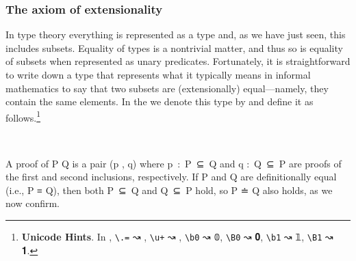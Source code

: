\subsubsection{The axiom of extensionality}\label{sec:axiom-ext}
In type theory everything is represented as a type and, as we have just seen, this includes subsets.  Equality of types is a nontrivial matter, and thus so is equality of subsets when represented as unary predicates.  Fortunately, it is straightforward to write down a type that represents what it typically means in informal mathematics to say that two subsets are (extensionally) equal---namely, they contain the same elements. In the \ualib we denote this type by  and define it as follows.\footnote{\label{uhints}%
  \textbf{Unicode Hints}. In \agdamode, \texttt{\textbackslash{}.=} ↝ , \texttt{\textbackslash{}u+} ↝ , \texttt{\textbackslash{}b0} ↝ \af 𝟘, \texttt{\textbackslash{}B0} ↝ \af 𝟎, \texttt{\textbackslash{}b1} ↝ \af 𝟙, \texttt{\textbackslash{}B1} ↝ \af 𝟏.}
\ccpad
\begin{code}
\>[0]\AgdaSpace{}%
\AgdaSymbol{:}\AgdaSpace{}%
\AgdaSpace{}%
\AgdaSpace{}%
\AgdaSpace{}%
\AgdaSpace{}%
\AgdaSpace{}%
\AgdaSpace{}%
\AgdaSpace{}%
\AgdaSpace{}%
\AgdaSpace{}%
\AgdaSpace{}%
\AgdaSpace{}%
\AgdaSpace{}%
\AgdaSpace{}%
\<%
\\
\>[0]\AgdaSpace{}%
\AgdaSpace{}%
\AgdaSpace{}%
\AgdaSymbol{=}\AgdaSpace{}%
\AgdaSymbol{(}\AgdaSpace{}%
\AgdaSpace{}%
\AgdaSymbol{)}\AgdaSpace{}%
\AgdaSpace{}%
\AgdaSymbol{(}\AgdaSpace{}%
\AgdaSpace{}%
\AgdaSymbol{)}\<%
\end{code}
\ccpad
A proof of \ab P  Q is a pair (\ab p , \ab q) where \ab p~\as :~\ab P~\aof ⊆~\ab Q and \ab q :~\ab Q~\aof ⊆~\ab P are proofs of the first and second inclusions, respectively. If \ab P and \ab Q are definitionally equal (i.e., \ab P \aod ≡ \ab Q), then both \ab P~\aof ⊆~\ab Q and \ab Q~\aof ⊆~\ab P hold, so \ab P \aof ≐ \ab Q also holds, as we now confirm.
